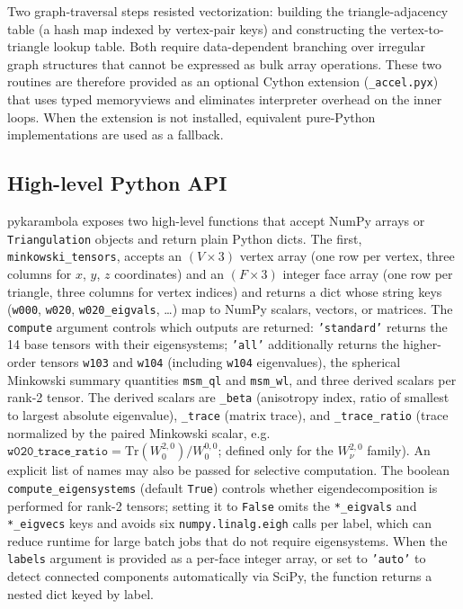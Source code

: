 \documentclass[unnumsec,webpdf,contemporary,large,namedate]{oup-authoring-template}
\begin{document}
Two graph-traversal steps resisted vectorization: building the triangle-adjacency table (a hash map indexed by vertex-pair keys) and constructing the vertex-to-triangle lookup table.
Both require data-dependent branching over irregular graph structures that cannot be expressed as bulk array operations.
These two routines are therefore provided as an optional Cython extension (\texttt{\_accel.pyx}) that uses typed memoryviews and eliminates interpreter overhead on the inner loops.
When the extension is not installed, equivalent pure-Python implementations are used as a fallback.

\subsection{High-level Python API}
pykarambola exposes two high-level functions that accept NumPy arrays or \texttt{Triangulation} objects and return plain Python dicts.
The first, \texttt{minkowski\_tensors}, accepts an $(V \times 3)$ vertex array (one row per vertex, three columns for $x$, $y$, $z$ coordinates) and an $(F \times 3)$ integer face array (one row per triangle, three columns for vertex indices) and returns a dict whose string keys (\texttt{w000}, \texttt{w020}, \texttt{w020\_eigvals}, \ldots) map to NumPy scalars, vectors, or matrices.
The \texttt{compute} argument controls which outputs are returned: \texttt{'standard'} returns the 14 base tensors with their eigensystems; \texttt{'all'} additionally returns the higher-order tensors \texttt{w103} and \texttt{w104} (including \texttt{w104} eigenvalues), the spherical Minkowski summary quantities \texttt{msm\_ql} and \texttt{msm\_wl}, and three derived scalars per rank-2 tensor.
The derived scalars are \texttt{\_beta} (anisotropy index, ratio of smallest to largest absolute eigenvalue), \texttt{\_trace} (matrix trace), and \texttt{\_trace\_ratio} (trace normalized by the paired Minkowski scalar, e.g.\ $\texttt{w020\_trace\_ratio} = \mathrm{Tr}(W_0^{2,0})/W_0^{0,0}$; defined only for the $W_\nu^{2,0}$ family).
An explicit list of names may also be passed for selective computation.
The boolean \texttt{compute\_eigensystems} (default \texttt{True}) controls whether eigendecomposition is performed for rank-2 tensors; setting it to \texttt{False} omits the \texttt{*\_eigvals} and \texttt{*\_eigvecs} keys and avoids six \texttt{numpy.linalg.eigh} calls per label, which can reduce runtime for large batch jobs that do not require eigensystems.
When the \texttt{labels} argument is provided as a per-face integer array, or set to \texttt{'auto'} to detect connected components automatically via SciPy, the function returns a nested dict keyed by label.
\end{document}
